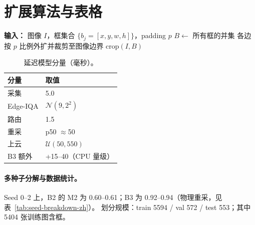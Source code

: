 \section{扩展算法与表格}
\label{sec:app-extended-zh}

\begin{algorithm}[t]
\caption{COCO ROI 裁剪（并集 + padding）}
\begin{algorithmic}[1]
\STATE \textbf{输入：} 图像 $I$，框集合 $\{b_j=[x,y,w,h]\}$，padding $p$
\STATE $B \leftarrow$ 所有框的并集
\STATE 各边按 $p$ 比例外扩并裁剪至图像边界
\RETURN $\mathrm{crop}(I, B)$
\end{algorithmic}
\end{algorithm}

\begin{table}[h]
\centering
\caption{B3 训练超参数（ShezhenV3 train）。}
\label{tab:b3-hparams-zh}
\small
{}
\end{table}

\begin{table}[h]
\centering
\caption{延迟模型分量（毫秒）。}
\label{tab:latency-model-zh}
\small
\begin{tabular}{ll}
\hline
分量 & 取值 \\
\hline
采集 & 5.0 \\
Edge-IQA & $\mathcal{N}(9,2^2)$ \\
路由 & 1.5 \\
重采 & p50 $\approx$50 \\
上云 & $\mathcal{U}(50,550)$ \\
B3 额外 & +15--40（CPU 量级） \\
\hline
\end{tabular}
\end{table}

\paragraph{多种子分解与数据统计。}
Seed 0--2 上，B2 的 M2 为 0.60--0.61；B3 为 0.92--0.94（物理重采，见表~\ref{tab:seed-breakdown-zh}）。
划分规模：train 5594 / val 572 / test 553；其中 5404 张训练图含框。

